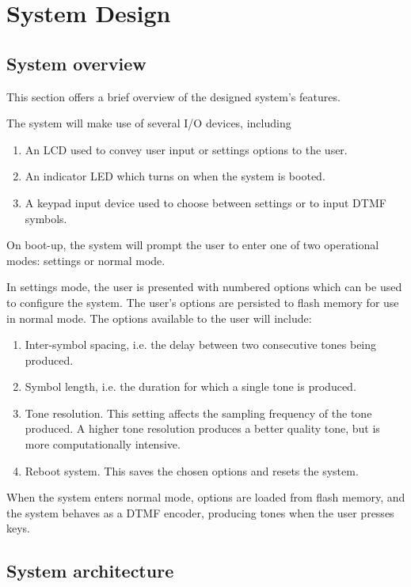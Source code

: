 \documentclass[11pt,a4paper
]{scrartcl}
\begin{document}
\section{System Design}

\subsection{System overview}

This section offers a brief overview of the designed system's features.

The system will make use of several I/O devices, including
\begin{enumerate}
   \item An LCD used to convey user input or settings options to the user.
   \item An indicator LED which turns on when the system is booted.
   \item A keypad input device used to choose between settings or to input DTMF symbols.
\end{enumerate}

On boot-up, the system will prompt the user to enter one of two operational modes: settings or normal mode.

In settings mode, the user is presented with numbered options which can be used to configure the system. 
The user's options are persisted to flash memory for use in normal mode.
The options available to the user will include:

\begin{enumerate}
   \item Inter-symbol spacing, i.e. the delay between two consecutive tones being produced.
   \item Symbol length, i.e. the duration for which a single tone is produced.
   \item Tone resolution. This setting affects the sampling frequency of the tone produced. A higher tone resolution produces a better quality tone, but is more computationally intensive.
   \item Reboot system. This saves the chosen options and resets the system.
\end{enumerate}

When the system enters normal mode, options are loaded from flash memory, and the system behaves as a DTMF encoder, 
producing tones when the user presses keys.

\subsection{System architecture}
\end{document}
